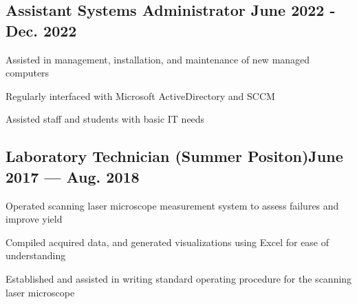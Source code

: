 \subsection{{Assistant Systems Administrator \hfill June 2022 - Dec. 2022}}
\begin{zitemize}
	\item Assisted in management, installation, and maintenance of new managed computers
	\item Regularly interfaced with Microsoft ActiveDirectory and SCCM
	\item Assisted staff and students with basic IT needs
\end{zitemize}

\subsection{{Laboratory Technician (Summer Positon)\hfill June 2017 --- Aug. 2018}}
\begin{zitemize}
	\item Operated scanning laser microscope measurement system to assess failures and improve yield
	\item Compiled acquired data, and generated visualizations using Excel for ease of understanding
	\item Established and assisted in writing standard operating procedure for the scanning laser microscope
\end{zitemize}
